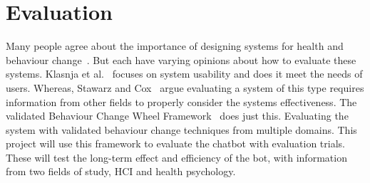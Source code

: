 
\newpage
\section{Evaluation}

Many people agree about the importance of designing systems for health and behaviour
change~\cite{article_mhealth, article_designing_for_healthy_lifestyles, article_designing_for_health_behaviour_change_hci}.
But each have varying opinions about how to evaluate these systems. Klasnja et al.~\cite{article_evaluate_tech_health_behaviour_change} focuses on system usability and does it meet the needs of users.
Whereas, Stawarz and Cox~\cite{article_designing_for_health_behaviour_change_hci} argue evaluating a system of this type requires information from other fields
to properly consider the systems effectiveness. The validated Behaviour Change Wheel Framework~\cite{article_behaviour_change_wheel} does just this.
Evaluating the system with validated behaviour change techniques from multiple domains. This project will use this framework to evaluate the chatbot with evaluation trials.
These will test the long-term effect and efficiency of the bot, with information from two fields of study, HCI and health psychology.

